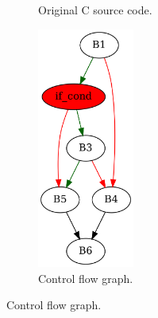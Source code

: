 \begin{figure}[htbp]
	\centering
	\begin{subfigure}[b]{0.30\textwidth}
		\centering
		
		\caption{Original C source code.}
	\end{subfigure}
	\begin{subfigure}[b]{0.50\textwidth}
		\centering
		\includegraphics[width=0.35\textwidth]{inc/appendices/examples/interval/counter-example/bool_propagation_jump/f_0001b.png}
		\caption{Control flow graph.}
	\end{subfigure}
\end{figure}

